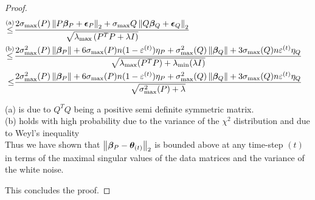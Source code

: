 \documentclass{article} %
\newcommand{\norm}[1]{\left\lVert#1\right\rVert}
\begin{document}
\begin{appendices}
\begin{proof}
\begin{align*}
			\overset{\mathrm{(a)}}{\leq} &\frac{2\sigma_{\max}(P)\norm{P\vbeta_P + \veps_P}_2 + \sigma_{\max}{Q}\norm{Q\vbeta_Q + \veps_Q}_2}{\sqrt{\lambda_{\max}\left(P^T P + \lambda I\right)}} &&\\
			\overset{\mathrm{(b)}}{\leq} & \frac{2\sigma^2_{\max}(P)\norm{\vbeta_P} + 6\sigma_{\max}(P)n(1-\varepsilon^{(t)})\eta_P + \sigma^2_{\max}(Q)\norm{\vbeta_Q} + 3\sigma_{\max}(Q)n\varepsilon^{(t)}\eta_Q}{\sqrt{\lambda_{\max}(P^T P) + \lambda_{\min}(\lambda I)}} &&\\
			\leq &\frac{2\sigma^2_{\max}(P)\norm{\vbeta_P} + 6\sigma_{\max}(P)n(1-\varepsilon^{(t)})\eta_P + \sigma^2_{\max}(Q)\norm{\vbeta_Q} + 3\sigma_{\max}(Q)n\varepsilon^{(t)}\eta_Q}{\sqrt{\sigma^2_{\max}(P) + \lambda}} &&\\
		\end{align*}
		
		(a) is due to $Q^TQ$ being a positive semi definite symmetric matrix. \\ 
		(b) holds with high probability due to the variance of the $\chi^2$ distribution and due to Weyl's inequality\\
		
		Thus we have shown that $\norm{\vbeta_P - \vtheta_{(t)}}_2$ is bounded above at any time-step $(t)$ in terms of the maximal singular values of the data matrices and the variance of the white noise. 
		
		This concludes the proof.
		
	\end{proof}
	

\end{appendices}
\end{document}
